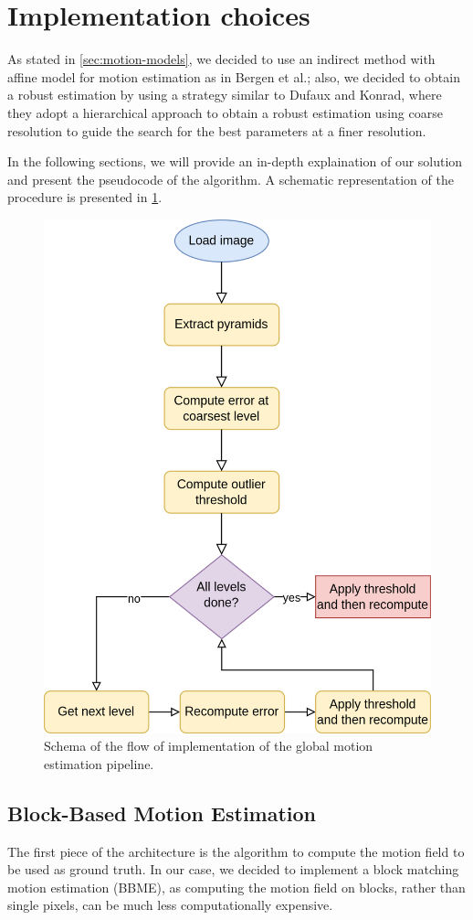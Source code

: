 \section{Implementation choices}
\label{sec:03-implementation}

As stated in \cref{sec:motion-models}, we decided to use an indirect method with affine model for motion estimation as in Bergen et al.\cite{Bergen92}; also, we decided to obtain a robust estimation by using a strategy similar to Dufaux and Konrad\cite{Dufeaux2000}, where they adopt a hierarchical approach to obtain a robust estimation using coarse resolution to guide the search for the best parameters at a finer resolution.

In the following sections, we will provide an in-depth explaination of our solution and present the pseudocode of the algorithm. A schematic representation of the procedure is presented in \cref{fig:implementation-flow}.

\begin{figure}
    \centering
    \includegraphics[width=.7\linewidth]{../assets/images/implementation-flow.png}
    \caption{Schema of the flow of implementation of the global motion estimation pipeline.}
    \label{fig:implementation-flow}
\end{figure}

\subsection{Block-Based Motion Estimation}
\label{sec:BBME}
The first piece of the architecture is the algorithm to compute the motion field to be used as ground truth.
In our case, we decided to implement a block matching motion estimation (BBME), as computing the motion field on blocks, rather than single pixels, can be much less computationally expensive.

